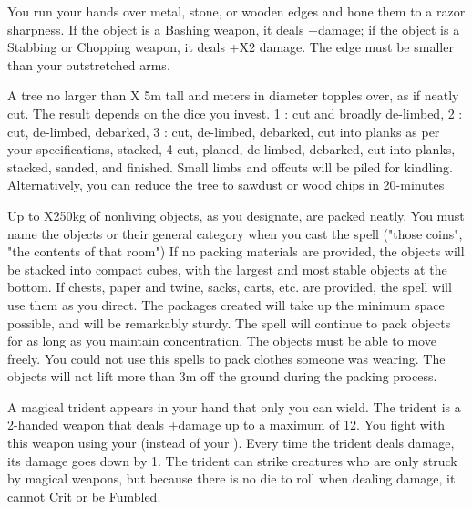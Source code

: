 You run your hands over \DICE metal, stone, or wooden edges and hone them to a razor sharpness. If the object is a Bashing weapon, it deals +\DICE damage; if the object is a Stabbing or Chopping weapon, it deals +\DICE X2 damage. The edge must be smaller than your outstretched arms.

\MYSTERY [
  Name = Millworks,
  Link = arcana-mystery-millworks,
  Paradigm = Entropy,
  Save = N,
  Duration = Instant,
  Target = Close Target(s)
]

A tree no larger than \DICE X 5m tall and \DICE meters in diameter topples over, as if neatly cut. The result depends on the dice you invest. 1 \DICE: cut and broadly de-limbed, 2 \DICE: cut, de-limbed, debarked, 3 \DICE: cut, de-limbed, debarked, cut into planks as per your specifications, stacked, 4 \DICE cut, planed, de-limbed, debarked, cut into planks, stacked, sanded, and finished. Small limbs and offcuts will be piled for kindling. Alternatively, you can reduce the tree to sawdust or wood chips in 20-\SUMDICE minutes


\MYSTERY [
  Name = Package Neatly,
  Link = arcana-mystery-package-neatly,
  Paradigm = Entropy,
  Save = n/a,
  Duration = Concentration or Permanent,
  Target = Nearby Target(s)
]

Up to \DICE X250kg of nonliving objects, as you designate, are packed neatly. You must name the objects or their general category when you cast the spell ("those coins", "the contents of that room") If no packing materials are provided, the objects will be stacked into compact cubes, with the largest and most stable objects at the bottom. If chests, paper and twine, sacks, carts, etc. are provided, the spell will use them as you direct. The packages created will take up the minimum space possible, and will be remarkably sturdy. The spell will continue to pack objects for as long as you maintain concentration. The objects must be able to move freely. You could not use this spells to pack clothes someone was wearing. The objects will not lift more than 3m off the ground during the packing process.

\MYSTERY [
  Name = Abyssal Trident,
  Link = arcana-mystery-abyssal-trident,
  Paradigm = Force,
  Save = N,
  Duration = Session,
  Target = Self
]

A magical trident appears in your hand that only you can wield.  The trident is a 2-handed weapon that deals \DICE+\DICE damage up to a maximum of 12.   You fight with this weapon using your \FOC (instead of your \VIG).  Every time the trident deals damage, its damage goes down by 1. The trident can strike creatures who are only struck by magical weapons, but because there is no die to roll when dealing damage, it cannot Crit or be Fumbled. 

